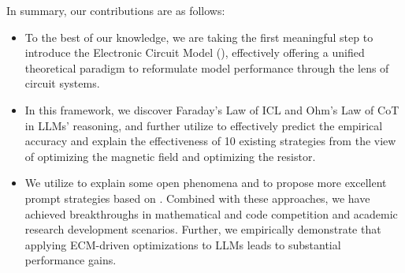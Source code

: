 In summary, our contributions are as follows:
\begin{itemize}[leftmargin=4ex]
    \item To the best of our knowledge, we are taking the first meaningful step to introduce the Electronic Circuit Model (\modelname{}), effectively offering a unified theoretical paradigm to reformulate model performance through the lens of circuit systems.
    \item In this framework, we discover Faraday's Law of ICL and Ohm's Law of CoT in LLMs' reasoning, and further utilize \modelname{} to effectively predict the empirical accuracy and explain the effectiveness of 10 existing strategies from the view of optimizing the magnetic field and optimizing the resistor.
    \item We utilize \modelname{} to explain some open phenomena and to propose more excellent prompt strategies based on \modelname{}. Combined with these approaches, we have achieved breakthroughs in mathematical and code competition and academic research development scenarios. Further, we empirically demonstrate that applying ECM-driven optimizations to LLMs leads to substantial performance gains.
\end{itemize}
